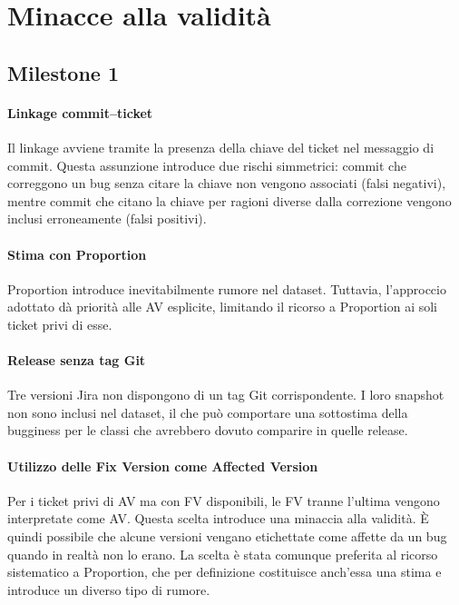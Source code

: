 \section{Minacce alla validità}

\subsection{Milestone 1}

\paragraph{Linkage commit--ticket}
Il linkage avviene tramite la presenza della chiave del ticket nel messaggio di commit.
Questa assunzione introduce due rischi simmetrici:
commit che correggono un bug senza citare la chiave non vengono associati (falsi negativi),
mentre commit che citano la chiave per ragioni diverse dalla correzione vengono inclusi
erroneamente (falsi positivi).

\paragraph{Stima con Proportion}
Proportion introduce inevitabilmente rumore nel dataset. Tuttavia, l'approccio adottato
dà priorità alle AV esplicite, limitando il ricorso a Proportion ai soli ticket privi di
esse.

\paragraph{Release senza tag Git}
Tre versioni Jira non dispongono di un tag Git corrispondente. I loro snapshot non sono
inclusi nel dataset, il che può comportare una sottostima della bugginess per le classi
che avrebbero dovuto comparire in quelle release.

\paragraph{Utilizzo delle Fix Version come Affected Version}
Per i ticket privi di AV ma con FV disponibili, le FV tranne l'ultima vengono
interpretate come AV. Questa scelta introduce una minaccia alla validità. È quindi possibile
che alcune versioni vengano etichettate come affette da un bug quando in realtà non lo
erano. La scelta è stata comunque preferita al ricorso sistematico a Proportion, che per definizione
costituisce anch'essa una stima e introduce un diverso tipo di rumore.

